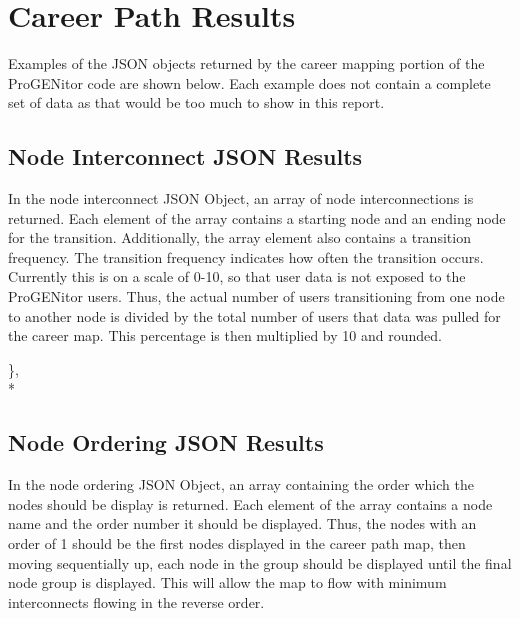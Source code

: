 \section{Career Path Results}
\label{sect:career-path-results}
Examples of the JSON objects returned by the career mapping portion of the
ProGENitor code are shown below.  Each example does not contain a complete set
of data as that would be too much to show in this report.

\subsection{Node Interconnect JSON Results}
In the node interconnect JSON Object, an array of node interconnections is
returned.  Each element of the array contains a starting node and an ending node
for the transition.  Additionally, the array element also contains a transition
frequency.  The transition frequency indicates how often the transition occurs. 
Currently this is on a scale of 0-10, so that user data is not exposed to the
ProGENitor users.  Thus, the actual number of users transitioning from one node
to another node is divided by the total number of users that data was pulled for
the career map.  This percentage is then multiplied by 10 and rounded.

\noindent[\{"Node Connections":[\\*
\{"node A":"Bachelors","node B":"Masters","transition frequency":6\},\\*
\{"node A":"Masters","node 	B":"Circuit Designer","transition frequency":7\},\\*
\{"node A":"Circuit Designer","node B":"Block 	Owner","transition
frequency":8\},\\* \{"node A":"Block Owner","node B":"Design Owner","transition
frequency":9\},\\*
\ldots\\* 
\{"node A":"Coder","node B":"Function Lead","transition frequency":0\},\\*
\{"node A":"Function Lead","node B":"Masters","transition frequency":0\}]\},\\*


\subsection{Node Ordering JSON Results}
In the node ordering JSON Object, an array containing the order which the nodes
should be display is returned.  Each element of the array contains a node name
and the order number it should be displayed.  Thus, the nodes with an order of
1 should be the first nodes displayed in the career path map, then
moving sequentially up, each node in the group should be displayed until the
final node group is displayed.  This will allow the map to flow with minimum
interconnects flowing in the reverse order.

